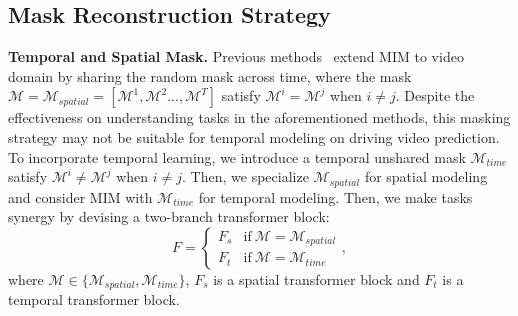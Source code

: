 


\subsection{Mask Reconstruction Strategy}
\label{sec:3.3}
\textbf{Temporal and Spatial Mask.}
Previous methods~\cite{videomae,videomae_v2} extend MIM to video domain by sharing the random mask across time, where the mask $\mathcal{M}=\mathcal{M}_{spatial}=[\mathcal{M}^1, \mathcal{M}^2..., \mathcal{M}^T]$ satisfy $\mathcal{M}^i = \mathcal{M}^j$ when $i\neq j$. Despite the effectiveness on understanding tasks in the aforementioned methods, this masking strategy may not be suitable for temporal modeling on driving video prediction.
To incorporate temporal learning, we introduce a temporal unshared mask $\mathcal{M}_{time}$ satisfy $\mathcal{M}^i \neq \mathcal{M}^j$ when $i\neq j$. Then, we specialize $\mathcal{M}_{spatial}$ for spatial modeling and consider MIM with $\mathcal{M}_{time}$ for temporal modeling. Then, we make tasks synergy by devising a two-branch transformer block: 
\begin{equation}
    F=
    \begin{cases}
        F_s&  \text{if}\  \mathcal{M} = \mathcal{M}_{spatial}\\
        F_t&  \text{if}\  \mathcal{M} = \mathcal{M}_{time}
    \end{cases},
\label{eq:img_diff}
\end{equation}
where $\mathcal{M} \in \{\mathcal{M}_{spatial}, \mathcal{M}_{time}\}$, $F_s$ is a spatial transformer block and $F_t$ is a temporal transformer block.

